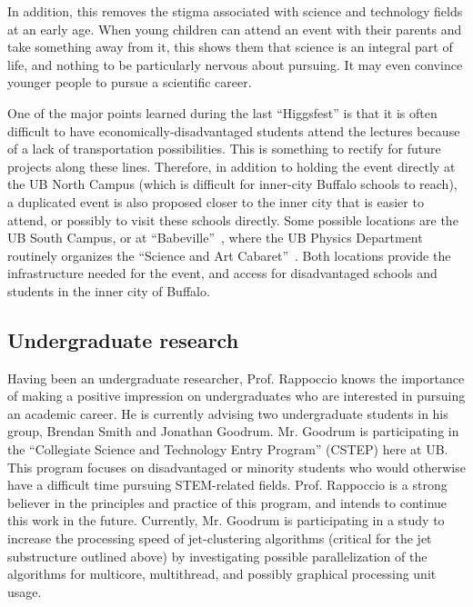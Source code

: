 \documentclass[12pt]{proposalnsf}
\begin{document}
In addition, this removes the stigma associated with science and
technology fields at an early age. When young children can attend an
event with their parents and take something away from it, this shows
them that science is an integral part of life, and nothing to be
particularly nervous about pursuing. It may even convince younger
people to pursue a scientific career. 

One of the major points learned during the last ``Higgsfest''
is that it is often difficult to have economically-disadvantaged
students attend the lectures because of a lack of transportation
possibilities. This is something to rectify for future
projects along these lines. Therefore, in addition to holding the
event directly
at the UB North Campus (which is difficult for inner-city
Buffalo schools to reach), a duplicated event is also proposed
closer to the inner city that is easier to attend, or possibly to
visit these schools directly. Some possible
locations are the UB South Campus, or at
``Babeville''~\cite{babeville}, where the UB Physics
Department routinely organizes the ``Science and Art
Cabaret''~\cite{cabaret}. Both locations 
provide the infrastructure needed for the event, and
access for disadvantaged schools and students in the inner city of
Buffalo. 





\subsection{Undergraduate research}

Having been an undergraduate researcher, Prof. Rappoccio knows the importance
of making a positive impression on undergraduates who are interested
in pursuing an academic career. 
He is currently advising two undergraduate students in his group,
Brendan Smith and Jonathan Goodrum. Mr. Goodrum is participating in the
``Collegiate Science and Technology Entry Program'' (CSTEP) here at
UB. This program focuses on disadvantaged or minority
students who would otherwise have a difficult time pursuing
STEM-related fields. Prof. Rappoccio is a strong believer in the principles and
practice of this program, and intends to continue this work in the
future. Currently, Mr. Goodrum is participating in a study to increase
the processing speed of jet-clustering algorithms (critical for the
jet substructure outlined above) by investigating possible
parallelization of the algorithms for multicore, multithread, and
possibly graphical processing unit usage. 
\end{document}
